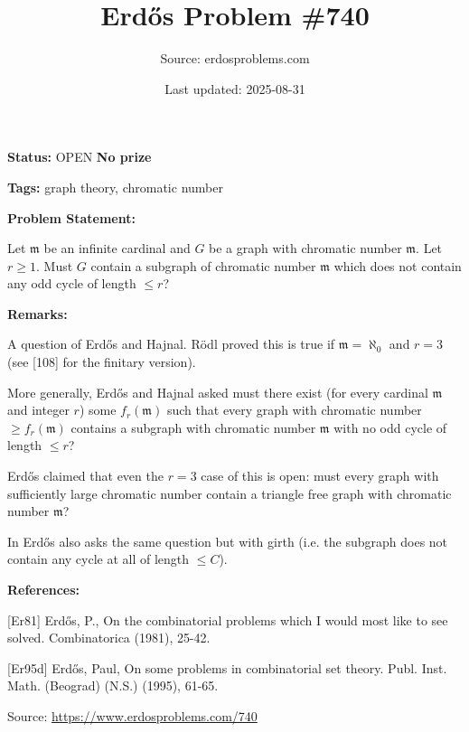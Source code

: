 \documentclass{article}
\title{Erd\H{o}s Problem \#740}
\date{Last updated: 2025-08-31}
\author{Source: erdosproblems.com}
\begin{document}
\maketitle

\noindent\textbf{Status:} OPEN \quad \textbf{No prize}

\noindent\textbf{Tags:} graph theory, chromatic number

\medskip
\noindent\textbf{Problem Statement:}

Let $\mathfrak{m}$ be an infinite cardinal and $G$ be a graph with chromatic number $\mathfrak{m}$. Let $r\geq 1$. Must $G$ contain a subgraph of chromatic number $\mathfrak{m}$ which does not contain any odd cycle of length $\leq r$?

\bigskip
\noindent\textbf{Remarks:}

A question of Erd\H{o}s and Hajnal. R\"{o}dl proved this is true if $\mathfrak{m}=\aleph_0$ and $r=3$ (see [108] for the finitary version).

More generally, Erd\H{o}s and Hajnal asked must there exist (for every cardinal $\mathfrak{m}$ and integer $r$) some $f_r(\mathfrak{m})$ such that every graph with chromatic number $\geq f_r(\mathfrak{m})$ contains a subgraph with chromatic number $\mathfrak{m}$ with no odd cycle of length $\leq r$?

Erd\H{o}s \cite{Er95d} claimed that even the $r=3$ case of this is open: must every graph with sufficiently large chromatic number contain a triangle free graph with chromatic number $\mathfrak{m}$?

In \cite{Er81} Erd\H{o}s also asks the same question but with girth (i.e. the subgraph does not contain any cycle at all of length $\leq C$).

\bigskip
\noindent\textbf{References:}

[Er81] Erd\H{o}s, P., On the combinatorial problems which I would most like to see solved. Combinatorica (1981), 25-42.
 
 [Er95d] Erd\H{o}s, Paul, On some problems in combinatorial set theory. Publ. Inst. Math. (Beograd) (N.S.) (1995), 61-65.

\bigskip
\noindent\small{Source: \url{https://www.erdosproblems.com/740}}
\end{document}

